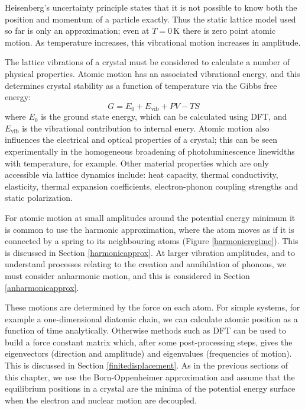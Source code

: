 Heisenberg's uncertainty principle states that it is not possible to know both the position and momentum of a particle exactly. Thus the static lattice model used so far is only an approximation; even at $T=0\,\textrm{K}$ there is zero point atomic motion. As temperature increases, this vibrational motion increases in amplitude.

The lattice vibrations of a crystal must be considered to calculate a number of physical properties. Atomic motion has an associated vibrational energy, and this determines crystal stability as a function of temperature via the Gibbs free energy:\autocite{Dove1993}
\begin{equation}
G = E_0+E_\textrm{vib}+PV-TS
\end{equation}
where $E_0$ is the ground state energy, which can be calculated using DFT, and $E_\textrm{vib}$ is the vibrational contribution to internal enery.
Atomic motion also influences the electrical and optical properties of a crystal; this can be seen experimentally in the homogeneous broadening of photoluminescence linewidths with temperature, for example.\autocite{silsbee1962}%
Other material properties which are only accessible via lattice dynamics include: heat capacity, thermal conductivity, elasticity, thermal expansion coefficients, electron-phonon coupling strengths and static polarization.

For atomic motion at small amplitudes around the potential energy minimum it is common to use the harmonic approximation, where the atom moves as if it is connected by a spring to its neighbouring atoms (Figure \ref{harmonicregime}). This is discussed in Section \ref{harmonicapprox}. At larger vibration amplitudes, and to understand processes relating to the creation and annihilation of phonons, we must consider anharmonic motion, and this is considered in Section \ref{anharmonicapprox}.

These motions are determined by the force on each atom. For simple systems, for example a one-dimensional diatomic chain, we can calculate atomic position as a function of time analytically. Otherwise methods such as DFT can be used to build a force constant matrix which, after some post-processing steps, gives the eigenvectors (direction and amplitude) and eigenvalues (frequencies of motion). This is discussed in Section \ref{finitedisplacement}. As in the previous sections of this chapter, we use the Born-Oppenheimer approximation and assume that the equilibrium positions in a crystal are the minima of the potential energy surface when the electron and nuclear motion are decoupled.

